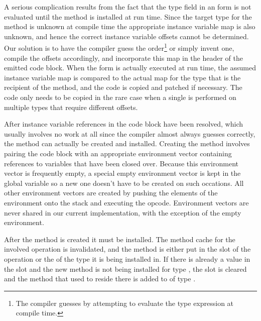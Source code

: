 A serious complication results from the fact that the type field in an
 form is not evaluated until the method is installed at
run time.  Since the target type for the method is unknown at compile
time the appropriate instance variable map is also unknown, and hence
the correct instance variable offsets cannot be determined.  Our
solution is to have the compiler guess the order\footnote{The compiler
guesses by attempting to evaluate the type expression at compile
time.} or simply invent one, compile the offsets accordingly, and
incorporate this map in the header of the emitted code block.  When
the  form is actually executed at run time, the assumed
instance variable map is compared to the actual map for the type that
is the recipient of the method, and the code is copied and patched if
necessary.  The code only needs to be copied in the rare case when a
single  is performed on multiple types that require
different offsets.

After instance variable references in the code block have been
resolved, which usually involves no work at all since the compiler
almost always guesses correctly, the method can actually be created
and installed.  Creating the method involves pairing the code block
with an appropriate environment vector containing references to
variables that have been closed over.  Because this environment vector
is frequently empty, a special empty environment vector is kept in the
global variable  so a new one doesn't have to
be created on such occations.  All other environment vectors are
created by pushing the elements of the environment onto the stack and
executing the  opcode.  Environment
vectors are never shared in our current implementation, with the
exception of the empty environment.

After the method is created it must be installed.  The method cache
for the involved operation is invalidated, and the method is either
put in the  slot of the operation or the
 of the type it is being installed in.  If
there is already a value in the  slot and the new method
is not being installed for type , the  slot is
cleared and the method that used to reside there is added to
 of type .


